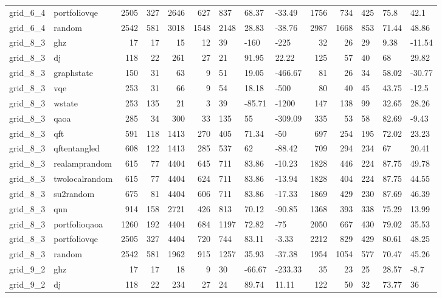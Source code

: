 \begin{longtable}{llrrrrlllrrlll}
grid\_6\_4 & portfoliovqe & 2505 & 327 & 2646 & 627 & 837 & 68.37 & -33.49 & 1756 & 734 & 425 & 75.8 & 42.1 \\
grid\_6\_4 & random & 2542 & 581 & 3018 & 1548 & 2148 & 28.83 & -38.76 & 2987 & 1668 & 853 & 71.44 & 48.86 \\
grid\_8\_3 & ghz & 17 & 17 & 15 & 12 & 39 & -160 & -225 & 32 & 26 & 29 & 9.38 & -11.54 \\
grid\_8\_3 & dj & 118 & 22 & 261 & 27 & 21 & 91.95 & 22.22 & 125 & 57 & 40 & 68 & 29.82 \\
grid\_8\_3 & graphstate & 150 & 31 & 63 & 9 & 51 & 19.05 & -466.67 & 81 & 26 & 34 & 58.02 & -30.77 \\
grid\_8\_3 & vqe & 253 & 31 & 66 & 9 & 54 & 18.18 & -500 & 80 & 40 & 45 & 43.75 & -12.5 \\
grid\_8\_3 & wstate & 253 & 135 & 21 & 3 & 39 & -85.71 & -1200 & 147 & 138 & 99 & 32.65 & 28.26 \\
grid\_8\_3 & qaoa & 285 & 34 & 300 & 33 & 135 & 55 & -309.09 & 335 & 53 & 58 & 82.69 & -9.43 \\
grid\_8\_3 & qft & 591 & 118 & 1413 & 270 & 405 & 71.34 & -50 & 697 & 254 & 195 & 72.02 & 23.23 \\
grid\_8\_3 & qftentangled & 608 & 122 & 1413 & 285 & 537 & 62 & -88.42 & 709 & 294 & 234 & 67 & 20.41 \\
grid\_8\_3 & realamprandom & 615 & 77 & 4404 & 645 & 711 & 83.86 & -10.23 & 1828 & 446 & 224 & 87.75 & 49.78 \\
grid\_8\_3 & twolocalrandom & 615 & 77 & 4404 & 624 & 711 & 83.86 & -13.94 & 1828 & 404 & 224 & 87.75 & 44.55 \\
grid\_8\_3 & su2random & 675 & 81 & 4404 & 606 & 711 & 83.86 & -17.33 & 1869 & 429 & 230 & 87.69 & 46.39 \\
grid\_8\_3 & qnn & 914 & 158 & 2721 & 426 & 813 & 70.12 & -90.85 & 1368 & 393 & 338 & 75.29 & 13.99 \\
grid\_8\_3 & portfolioqaoa & 1260 & 192 & 4404 & 684 & 1197 & 72.82 & -75 & 2050 & 667 & 430 & 79.02 & 35.53 \\
grid\_8\_3 & portfoliovqe & 2505 & 327 & 4404 & 720 & 744 & 83.11 & -3.33 & 2212 & 829 & 429 & 80.61 & 48.25 \\
grid\_8\_3 & random & 2542 & 581 & 1962 & 915 & 1257 & 35.93 & -37.38 & 1954 & 1054 & 577 & 70.47 & 45.26 \\
grid\_9\_2 & ghz & 17 & 17 & 18 & 9 & 30 & -66.67 & -233.33 & 35 & 23 & 25 & 28.57 & -8.7 \\
grid\_9\_2 & dj & 118 & 22 & 234 & 27 & 24 & 89.74 & 11.11 & 122 & 50 & 32 & 73.77 & 36 \\

\end{longtable}

